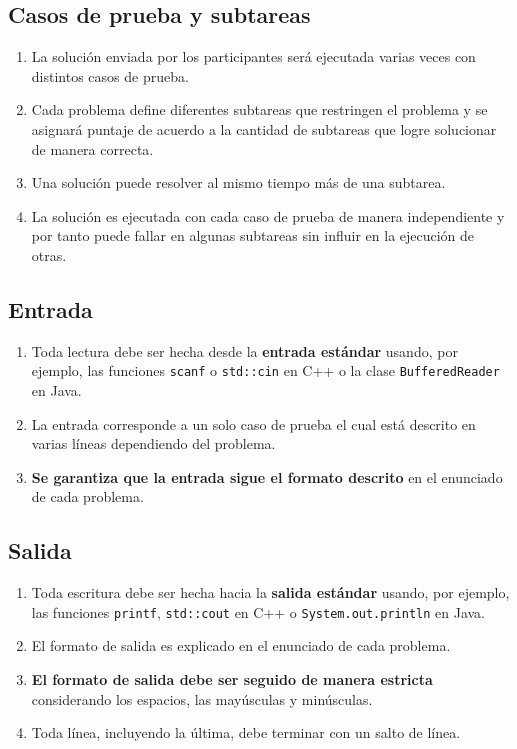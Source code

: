 \documentclass[12pt]{oci}
\begin{document}
\subsection*{Casos de prueba y subtareas}
\begin{enumerate}
\item La solución enviada por los participantes será ejecutada varias veces con
  distintos casos de prueba.
\item Cada problema define diferentes subtareas que restringen el problema y se
  asignará puntaje de acuerdo a la cantidad de subtareas que logre solucionar de
  manera correcta.
\item Una solución puede resolver al mismo tiempo más de una subtarea.
\item La solución es ejecutada con cada caso de prueba de manera independiente y
  por tanto puede fallar en algunas subtareas sin influir en la ejecución de
  otras.
\end{enumerate}

\subsection*{Entrada}
\begin{enumerate}
\item Toda lectura debe ser hecha desde la {\bf entrada estándar} usando, por
  ejemplo, las funciones \verb+scanf+ o \verb+std::cin+ en C++ o la clase
  \verb+BufferedReader+ en Java.
\item La entrada corresponde a un solo caso de prueba el cual está descrito en
  varias líneas dependiendo del problema.
\item {\bf Se garantiza que la entrada sigue el formato descrito} en el
  enunciado de cada problema.
\end{enumerate}

\newpage
\subsection*{Salida}
\begin{enumerate}
\item Toda escritura debe ser hecha hacia la {\bf salida estándar} usando, por
  ejemplo, las funciones \verb+printf+, \verb+std::cout+ en C++  o
  \verb+System.out.println+ en Java.
\item El formato de salida es explicado en el enunciado de cada problema.
\item {\bf El formato de salida debe ser seguido de manera estricta}
  considerando los espacios, las mayúsculas y minúsculas.
\item Toda línea, incluyendo la última, debe terminar con un salto de línea.
\end{enumerate}
\end{document}
